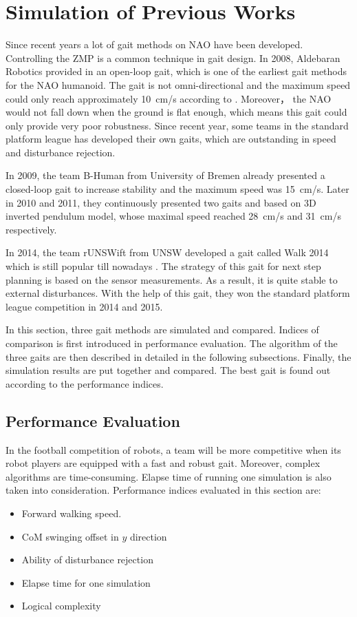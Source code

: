 \section {Simulation of Previous Works}
\label{simprework}
Since recent years a lot of gait methods on NAO have been developed. Controlling the ZMP is a common technique in gait design. In 2008, Aldebaran Robotics provided in \cite{gouaillier2008nao} an open-loop gait, which is one of the earliest gait methods for the NAO humanoid. The gait is not omni-directional and the maximum speed could only reach approximately \SI{10}{cm/s} according to \cite{graf2009robust}. Moreover， the NAO would not fall down when the ground is flat enough, which means this gait could only provide very poor robustness. Since recent year, some teams in the standard platform league has developed their own gaits, which are outstanding in speed and disturbance rejection. 

In 2009, the team B-Human from University of Bremen already presented a closed-loop gait to increase stability and the maximum speed was \SI{15}{cm/s}. Later in 2010 and 2011, they continuously presented two gaits \cite{Humanoids-Graf-Roefer-10} and \cite{graf2011center} based on 3D inverted pendulum model, whose maximal speed reached \SI{28}{cm/s} and \SI{31}{cm/s} respectively.

In 2014, the team rUNSWift from \ac{UNSW} developed a gait called Walk 2014 which is still popular till nowadays \cite{hengst2014runswift}. The strategy of this gait for next step planning is based on the sensor measurements. As a result, it is quite stable to external disturbances. With the help of this gait, they won the standard platform league competition in 2014 and 2015.

In this section, three gait methods \cite{kajita2003biped, graf2011center, hengst2014runswift} are simulated and compared. Indices of comparison is first introduced in performance evaluation. The algorithm of the three gaits are then described in detailed in the following subsections. Finally, the simulation results are put together and compared. The best gait is found out according to the performance indices.  
\subsection{Performance Evaluation}
In the football competition of robots, a team will be more competitive when its robot players are equipped with a fast and robust gait. Moreover, complex algorithms are time-consuming. Elapse time of running one simulation is also taken into consideration. Performance indices evaluated in this section are: 
\begin{itemize}
	\item Forward walking speed.
	\item CoM swinging offset in $ y $ direction
	\item Ability of disturbance rejection
	\item Elapse time for one simulation
	\item Logical complexity
\end{itemize} 

